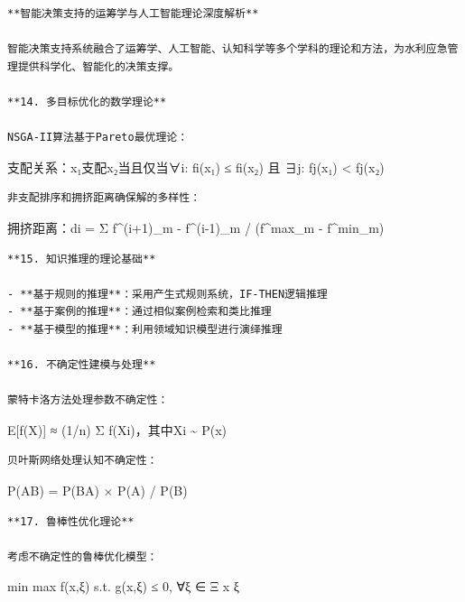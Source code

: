 \begin{lstlisting}
**智能决策支持的运筹学与人工智能理论深度解析**

智能决策支持系统融合了运筹学、人工智能、认知科学等多个学科的理论和方法，为水利应急管理提供科学化、智能化的决策支撑。

**14. 多目标优化的数学理论**

NSGA-II算法基于Pareto最优理论：
\end{lstlisting}

支配关系：x₁支配x₂当且仅当∀i: fi(x₁) ≤ fi(x₂) 且 ∃j: fj(x₁) \textless{} fj(x₂)

\begin{lstlisting}
非支配排序和拥挤距离确保解的多样性：
\end{lstlisting}

拥挤距离：di = Σ \textbar f\^{}(i+1)\_m - f\^{}(i-1)\_m\textbar{} / (f\^{}max\_m - f\^{}min\_m)

\begin{lstlisting}
**15. 知识推理的理论基础**

- **基于规则的推理**：采用产生式规则系统，IF-THEN逻辑推理
- **基于案例的推理**：通过相似案例检索和类比推理
- **基于模型的推理**：利用领域知识模型进行演绎推理

**16. 不确定性建模与处理**

蒙特卡洛方法处理参数不确定性：
\end{lstlisting}

E{[}f(X){]} ≈ (1/n) Σ f(Xi)，其中Xi \textasciitilde{} P(x)

\begin{lstlisting}
贝叶斯网络处理认知不确定性：
\end{lstlisting}

P(A\textbar B) = P(B\textbar A) × P(A) / P(B)

\begin{lstlisting}
**17. 鲁棒性优化理论**

考虑不确定性的鲁棒优化模型：
\end{lstlisting}

min max f(x,ξ) s.t. g(x,ξ) ≤ 0, ∀ξ ∈ Ξ x ξ

